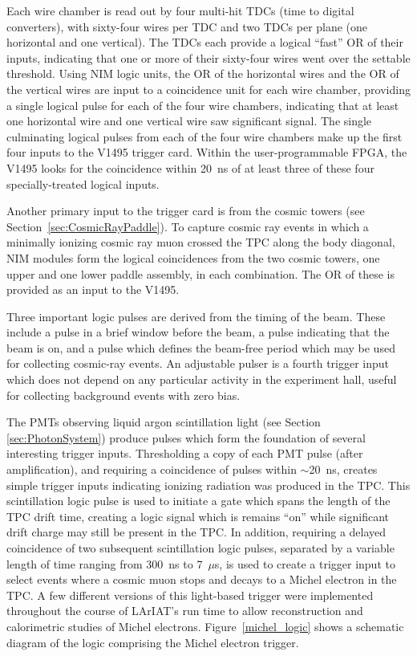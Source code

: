 Each wire chamber is read out by four multi-hit TDCs (time to digital converters), with sixty-four wires per TDC and two TDCs per plane (one horizontal and one vertical).  The TDCs each provide a logical ``fast'' OR of their inputs, indicating that one or more of their sixty-four wires went over the settable threshold.  Using NIM logic units, the OR of the horizontal wires and the OR of the vertical wires are input to a coincidence unit for each wire chamber, providing a single logical pulse for each of the four wire chambers, indicating that at least one horizontal wire and one vertical wire saw significant signal.  The single culminating logical pulses from each of the four wire chambers make up the first four inputs to the V1495 trigger card.  Within the user-programmable FPGA, the V1495 looks for the coincidence within 20~ns of at least three of these four specially-treated logical inputs.

Another primary input to the trigger card is from the cosmic towers (see Section~\ref{sec:CosmicRayPaddle}). To capture cosmic ray events in which a minimally ionizing cosmic ray muon crossed the TPC along the body diagonal, NIM modules form the logical coincidences from the two cosmic towers, one upper and one lower paddle assembly, in each combination.  The OR of these is provided as an input to the V1495. 

Three important logic pulses are derived from the timing of the beam.  These include a pulse in a brief window before the beam, a pulse indicating that the beam is on, and a pulse which defines the beam-free period which may be used for collecting cosmic-ray events.  An adjustable pulser is a fourth trigger input which does not depend on any particular activity in the experiment hall,  useful for collecting background events with zero bias. 

The PMTs observing liquid argon scintillation light (see Section \ref{sec:PhotonSystem}) produce pulses which form the foundation of several interesting trigger inputs.  Thresholding a copy of each PMT pulse (after amplification), and requiring a coincidence of pulses within $\sim$20~ns, creates simple trigger inputs indicating ionizing radiation was produced in the TPC.  This scintillation logic pulse is used to initiate a gate which spans the length of the TPC drift time, creating a logic signal which is remains ``on'' while significant drift charge may still be present in the TPC.  In addition, requiring a delayed coincidence of two subsequent scintillation logic pulses, separated by a variable length of time ranging from 300~ns to 7~$\mu$s, is used to create a trigger input to select events where a cosmic muon stops and decays to a Michel electron in the TPC.  A few different versions of this light-based trigger were implemented throughout the course of LArIAT's run time to allow reconstruction and calorimetric studies of Michel electrons. Figure~\ref{michel_logic} shows a schematic diagram of the logic comprising the Michel electron trigger. 

